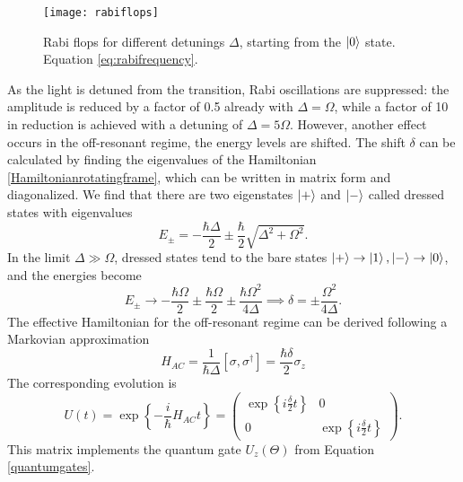 \begin{figure}[H]
\centering
\texttt{[image: rabiflops]}
\caption{Rabi flops for different detunings $\Delta$, starting from the $\ket{0}$ state. Equation \eqref{eq:rabifrequency}.}
\label{rabiflops}
\end{figure}
As the light is detuned from the transition, Rabi oscillations are suppressed: the amplitude is reduced by a factor of 0.5 already with $\Delta = \Omega$, while a factor of 10 in reduction is achieved with a detuning of $\Delta = 5\Omega$. However, another effect occurs in the off-resonant regime, the energy levels are shifted.
The shift $\delta$ can be calculated by finding the eigenvalues of the Hamiltonian \eqref{Hamiltonianrotatingframe}, which can be written in matrix form and diagonalized. We find that there are two eigenstates $\ket{+}$ and $\ket{-}$ called dressed states with eigenvalues
\begin{equation}
E_{\pm} = -\frac{\hbar\Delta}{2} \pm \frac{\hbar}{2}\sqrt{\Delta^2 +\Omega^2}.
\end{equation}
In the limit $\Delta \gg \Omega$, dressed states tend to the bare states $\ket{+} \to \ket{1},\ket{-}\to \ket{0}$, and the energies become
\begin{equation}
\label{eq:starkshift}
E_{\pm} \to -\frac{\hbar \Omega}{2} \pm \frac{\hbar \Omega}{2} \pm \frac{\hbar \Omega^2}{4\Delta} \implies \delta = \pm\frac{\Omega^2}{4\Delta}.
\end{equation}
The effective Hamiltonian for the off-resonant regime can be derived following a Markovian approximation \cite{acstarkhamiltonian}
\begin{equation}
H_{AC} = \frac{1}{\hbar \Delta} [\sigma,\sigma^\dagger] = \frac{\hbar \delta}{2}\sigma_z
\end{equation}
The corresponding evolution is
\begin{equation}
\label{acstarkrotation}
U(t) = \exp\left\{-\frac{i}{\hbar} H_{AC} t \right\} =
 \begin{pmatrix}
   \exp\left\{i\frac{\delta}{2}t\right\} & 0\\
   0 & \exp\left\{i\frac{\delta}{2}t\right\}
\end{pmatrix}.
\end{equation}
This matrix implements the quantum gate $U_z(\Theta)$ from Equation \eqref{quantumgates}.


